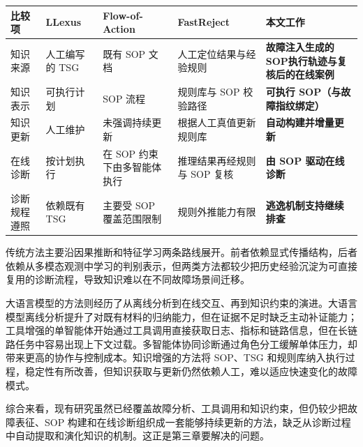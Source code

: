 \begin{table}[H]
\centering
{}
\label{tab:related-work-comparison}
\renewcommand{\arraystretch}{1.3}
\footnotesize
\setlength{\tabcolsep}{4pt}
\begin{tabularx}{\textwidth}{>{\raggedright\arraybackslash}p{2.2cm}>{\raggedright\arraybackslash}X>{\raggedright\arraybackslash}X>{\raggedright\arraybackslash}X>{\raggedright\arraybackslash}X}
\toprule
\rowcolor{lightgray!30}
\textbf{比较项} & \textbf{LLexus} & \textbf{Flow-of-Action} & \textbf{FastReject} & \textbf{本文工作} \\
\midrule
知识来源 & 人工编写的 TSG & 既有 SOP 文档 & 人工定位结果与经验规则 & \textbf{故障注入生成的 SOP执行轨迹与复核后的在线案例} \\
知识表示 & 可执行计划 & SOP 流程 & 规则库与 SOP 校验路径 & \textbf{可执行 SOP（与故障指纹绑定）} \\
知识更新 & 人工维护 & 未强调持续更新 & 根据人工真值更新规则库 & \textbf{自动构建并增量更新} \\
在线诊断 & 按计划执行 & 在 SOP 约束下由多智能体执行 & 推理结果再经规则与 SOP 复核 & \textbf{由 SOP 驱动在线诊断} \\
诊断规程遵照 & 依赖既有 TSG & 主要受 SOP 覆盖范围限制 & 规则外推能力有限 & \textbf{逃逸机制支持继续排查} \\
\bottomrule
\end{tabularx}
\setlength{\tabcolsep}{6pt}
\end{table}

传统方法主要沿因果推断和特征学习两条路线展开。前者依赖显式传播结构，后者依赖从多模态观测中学习的判别表示，但两类方法都较少把历史经验沉淀为可直接复用的诊断流程，导致知识难以在不同故障场景间迁移。

大语言模型的方法则经历了从离线分析到在线交互、再到知识约束的演进。大语言模型离线分析提升了对既有材料的归纳能力，但在证据不足时缺乏主动补证能力；工具增强的单智能体开始通过工具调用直接获取日志、指标和链路信息，但在长链路任务中容易出现上下文过载。多智能体协同诊断通过角色分工缓解单体压力，却带来更高的协作与控制成本。知识增强的方法将 SOP、TSG 和规则库纳入执行过程，稳定性有所改善，但知识获取与更新仍然依赖人工，难以适应快速变化的故障模式。

综合来看，现有研究虽然已经覆盖故障分析、工具调用和知识约束，但仍较少把故障表征、SOP 构建和在线诊断组织成一套能够持续更新的方法，缺乏从诊断过程中自动提取和演化知识的机制。这正是第三章要解决的问题。
